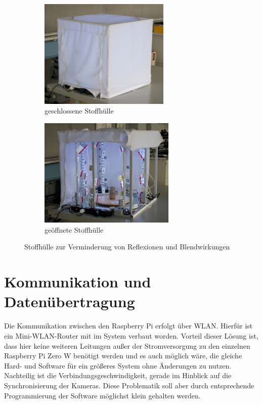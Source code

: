 \documentclass[./00PhotoBox.tex]{subfiles}
\begin{document}
\begin{figure}
    \centering
    \begin{subfigure}{0.45\textwidth}
        \includegraphics[height=5.2cm]{./img/3_aufbau/stoffhuelle.jpg}
        \centering
        \caption{geschlossene Stoffhülle}
        \label{img:stoffhuelle}
    \end{subfigure}
    \begin{subfigure}{0.45\textwidth}
        \includegraphics[height=5.2cm]{./img/3_aufbau/stoffhuelle_offen.jpg}
        \centering
        \caption{geöffnete Stoffhülle}
        \label{img:stoffhuelle_offen}
    \end{subfigure}
    \caption{Stoffhülle zur Verminderung von Reflexionen und Blendwirkungen}
\end{figure}

\section{Kommunikation und Datenübertragung}
Die Kommunikation zwischen den Raspberry Pi  erfolgt über WLAN. Hierfür ist ein Mini-WLAN-Router mit im System verbaut worden. Vorteil dieser Lösung ist, dass hier keine weiteren Leitungen außer der Stromversorgung zu den einzelnen Raspberry Pi Zero W benötigt werden und es auch möglich wäre, die gleiche Hard- und Software für ein größeres System ohne Änderungen zu nutzen. Nachteilig ist die Verbindungsgeschwindigkeit, gerade im Hinblick auf die Synchronisierung der Kameras. Diese Problematik soll aber durch entsprechende Programmierung der Software möglichst klein gehalten werden.
\end{document}
